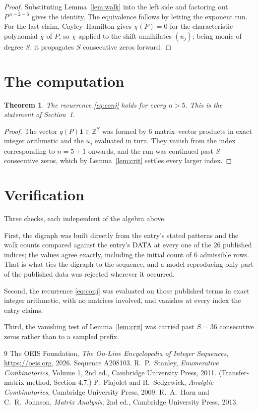 \documentclass[11pt,a4paper]{article}
\theoremstyle{plain}
\newtheorem{theorem}{Theorem}
\theoremstyle{definition}
\begin{document}
\begin{proof}
Substituting Lemma~\ref{lem:walk} into the left side and factoring out
$P^{\,n-2-6}$ gives the identity. The equivalence follows by letting the exponent
run. For the last claim, Cayley--Hamilton gives $\chi(P)=0$ for the characteristic
polynomial $\chi$ of $P$, so $\chi$ applied to the shift annihilates $(u_j)$; being monic of
degree $S$, it propagates $S$ consecutive zeros forward.
\end{proof}

\section{The computation}

\begin{theorem}
The recurrence \eqref{eq:conj} holds for every $n>5$. This is the statement of
Section~1.
\end{theorem}

\begin{proof}
The vector $q(P)\mathbf{1}\in\mathbb{Z}^{S}$ was formed by $6$ matrix--vector
products in exact integer arithmetic and the $u_j$ evaluated in turn. They vanish from the
index corresponding to $n=5+1$ onwards, and the run was continued past $S$ consecutive
zeros, which by Lemma~\ref{lem:crit} settles every larger index.
\end{proof}

\section{Verification}

Three checks, each independent of the algebra above.

First, the digraph was built directly from the entry's stated patterns and the walk counts
compared against the entry's DATA at every one of the $26$ published indices; the
values agree exactly, including the initial count of $6$ admissible rows. That is
what ties the digraph to the sequence, and a model reproducing only part of the published
data was rejected wherever it occurred.

Second, the recurrence \eqref{eq:conj} was evaluated on those published terms in exact
integer arithmetic, with no matrices involved, and vanishes at every index the entry claims.

Third, the vanishing test of Lemma~\ref{lem:crit} was carried past $S=36$ consecutive
zeros rather than to a sampled prefix.

\begin{thebibliography}{9}
 The OEIS Foundation, \emph{The On-Line Encyclopedia of Integer
Sequences}, \url{https://oeis.org}, 2026. Sequence A208103.
 R.~P.~Stanley, \emph{Enumerative Combinatorics}, Volume 1, 2nd ed.,
Cambridge University Press, 2011. (Transfer-matrix method, Section 4.7.)
 P.~Flajolet and R.~Sedgewick, \emph{Analytic Combinatorics}, Cambridge
University Press, 2009.
 R.~A.~Horn and C.~R.~Johnson, \emph{Matrix Analysis}, 2nd ed., Cambridge
University Press, 2013.
\end{thebibliography}
\end{document}
